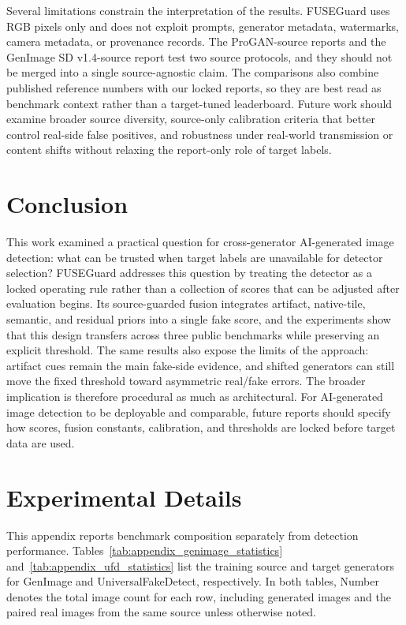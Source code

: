 \documentclass[lettersize,journal]{IEEEtran}
\begin{document}
Several limitations constrain the interpretation of the results. FUSEGuard uses RGB pixels only and does not exploit prompts, generator metadata, watermarks, camera metadata, or provenance records. The ProGAN-source reports and the GenImage SD v1.4-source report test two source protocols, and they should not be merged into a single source-agnostic claim. The comparisons also combine published reference numbers with our locked reports, so they are best read as benchmark context rather than a target-tuned leaderboard. Future work should examine broader source diversity, source-only calibration criteria that better control real-side false positives, and robustness under real-world transmission or content shifts without relaxing the report-only role of target labels.

\section{Conclusion}
\label{sec:conclusion}
This work examined a practical question for cross-generator AI-generated image detection: what can be trusted when target labels are unavailable for detector selection? FUSEGuard addresses this question by treating the detector as a locked operating rule rather than a collection of scores that can be adjusted after evaluation begins. Its source-guarded fusion integrates artifact, native-tile, semantic, and residual priors into a single fake score, and the experiments show that this design transfers across three public benchmarks while preserving an explicit threshold. The same results also expose the limits of the approach: artifact cues remain the main fake-side evidence, and shifted generators can still move the fixed threshold toward asymmetric real/fake errors. The broader implication is therefore procedural as much as architectural. For AI-generated image detection to be deployable and comparable, future reports should specify how scores, fusion constants, calibration, and thresholds are locked before target data are used.




\clearpage
\onecolumn
\section*{Experimental Details}

This appendix reports benchmark composition separately from detection performance. Tables~\ref{tab:appendix_genimage_statistics} and~\ref{tab:appendix_ufd_statistics} list the training source and target generators for GenImage and UniversalFakeDetect, respectively. In both tables, Number denotes the total image count for each row, including generated images and the paired real images from the same source unless otherwise noted.
\end{document}
